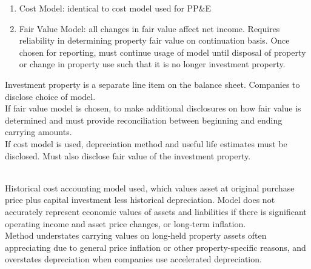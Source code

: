 \begin{remark} 
\begin{enumerate}[label=\roman*.]
\setlength{\itemsep}{0pt}
\item Cost Model: identical to cost model used for PP\&E
\item Fair Value Model: all changes in fair value affect net income. Requires reliability in determining property fair value on continuation basis. Once chosen for reporting, must continue usage of model until disposal of property or change in property use such that it is no longer investment property.
\end{enumerate}
Investment property is a separate line item on the balance sheet. Companies to disclose choice of model.\\
If fair value model is chosen, to make additional disclosures on how fair value is determined and must provide reconciliation between beginning and ending carrying amounts.\\
If cost model is used, depreciation method and useful life estimates must be disclosed. Must also disclose fair value of the investment property.
\end{remark}

\begin{remark} \\
Historical cost accounting model used, which values asset at original purchase price plus capital investment less historical depreciation. Model does not accurately represent economic values of assets and liabilities if there is significant operating income and asset price changes, or long-term inflation.\\
Method understates carrying values on long-held property assets often appreciating due to general price inflation or other property-specific reasons, and overstates depreciation when companies use accelerated depreciation.
\end{remark}

